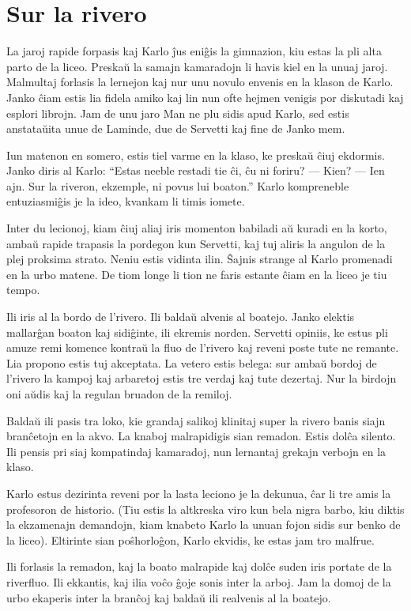 \chapter{Sur la rivero}

La jaroj rapide forpasis kaj Karlo ĵus eniĝis la gimnazion, kiu estas la pli alta parto de la liceo. Preskaŭ la samajn kamaradojn li havis kiel en la unuaj jaroj. Malmultaj forlasis la lernejon kaj nur unu novulo envenis en la klason de Karlo. Janko ĉiam estis lia fidela amiko kaj lin nun ofte hejmen venigis por diskutadi kaj esplori librojn. Jam de unu jaro Man ne plu sidis apud Karlo, sed estis anstataŭita unue de Laminde, due de Servetti kaj fine de Janko mem.

Iun matenon en somero, estis tiel varme en la klaso, ke preskaŭ ĉiuj ekdormis. Janko diris al Karlo: ``Estas neeble restadi tie ĉi, ĉu ni foriru? — Kien? — Ien ajn. Sur la riveron, ekzemple, ni povus lui boaton.'' Karlo kompreneble entuziasmiĝis je la ideo, kvankam li timis iomete.

Inter du lecionoj, kiam ĉiuj aliaj iris momenton babiladi aŭ kuradi en la korto, ambaŭ rapide trapasis la pordegon kun Servetti, kaj tuj aliris la angulon de la plej proksima strato. Neniu estis vidinta ilin. Ŝajnis strange al Karlo promenadi en la urbo matene. De tiom longe li tion ne faris estante ĉiam en la liceo je tiu tempo.

Ili iris al la bordo de l'rivero. Ili baldaŭ alvenis al boatejo. Janko elektis mallarĝan boaton kaj sidiĝinte, ili ekremis norden. Servetti opiniis, ke estus pli amuze remi komence kontraŭ la fluo de l'rivero kaj reveni poste tute ne remante. Lia propono estis tuj akceptata. La vetero estis belega: sur ambaŭ bordoj de l'rivero la kampoj kaj arbaretoj estis tre verdaj kaj tute dezertaj. Nur la birdojn oni aŭdis kaj la regulan bruadon de la remiloj.

Baldaŭ ili pasis tra loko, kie grandaj salikoj klinitaj super la rivero banis siajn branĉetojn en la akvo. La knaboj malrapidigis sian remadon. Estis dolĉa silento. Ili pensis pri siaj kompatindaj kamaradoj, nun lernantaj grekajn verbojn en la klaso.

Karlo estus dezirinta reveni por la lasta leciono je la dekunua, ĉar li tre amis la profesoron de historio. (Tiu estis la altkreska viro kun bela nigra barbo, kiu diktis la ekzamenajn demandojn, kiam knabeto Karlo la unuan fojon sidis sur benko de la liceo). Eltirinte sian poŝhorloĝon, Karlo ekvidis, ke estas jam tro malfrue.

Ili forlasis la remadon, kaj la boato malrapide kaj dolĉe suden iris portate de la riverfluo. Ili ekkantis, kaj ilia voĉo ĝoje sonis inter la arboj. Jam la domoj de la urbo ekaperis inter la branĉoj kaj baldaŭ ili realvenis al la boatejo.


